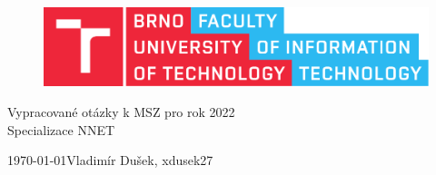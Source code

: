 \documentclass{fitthesis}
\begin{document}
\begin{titlepage}
    \begin{center}


        \begin{figure}[htb]
            \centering
            \includegraphics[width=0.85\hsize]{fitlogo.pdf}
        \end{figure}


        {\Huge Vypracované otázky k MSZ pro rok 2022} \\
        \bigskip
        \bigskip
        {\LARGE Specializace NNET}

    \end{center}

    {\Large \today \hfill Vladimír Dušek, xdusek27}

\end{titlepage}





\tableofcontents
\newpage



\newpage


\newpage


\newpage


\newpage


\newpage


\newpage


\newpage


\newpage


\newpage

\end{document}
